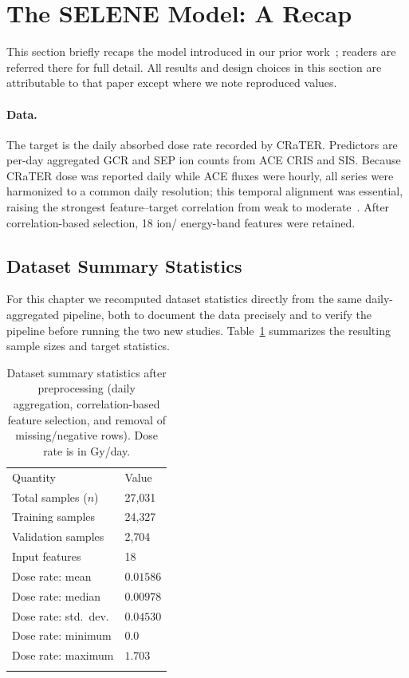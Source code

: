 \documentclass[graybox]{SNmult}
\begin{document}
\section{The SELENE Model: A Recap}
\label{sec:selene}

This section briefly recaps the model introduced in our prior
work~\cite{tummala2025selene}; readers are referred there for full detail. All
results and design choices in this section are attributable to that paper except
where we note reproduced values.

\paragraph{Data.}
The target is the daily absorbed dose rate recorded by CRaTER. Predictors are
per-day aggregated GCR and SEP ion counts from ACE CRIS and SIS. Because CRaTER
dose was reported daily while ACE fluxes were hourly, all series were harmonized
to a common daily resolution; this temporal alignment was essential, raising the
strongest feature--target correlation from weak to
moderate~\cite{tummala2025selene}. After correlation-based selection, 18 ion/
energy-band features were retained.

\subsection{Dataset Summary Statistics}
\label{sec:dataset-stats}
For this chapter we recomputed dataset statistics directly from the same daily-
aggregated pipeline, both to document the data precisely and to verify the
pipeline before running the two new studies. Table~\ref{tab:dataset} summarizes
the resulting sample sizes and target statistics.

\begin{table}[t]
  \caption{Dataset summary statistics after preprocessing (daily aggregation,
  correlation-based feature selection, and removal of missing/negative rows).
  Dose rate is in Gy/day.}
  \label{tab:dataset}
  \begin{tabular}{p{5.5cm}p{2.5cm}}
    \hline\noalign{\smallskip}
    Quantity & Value \\
    \noalign{\smallskip}\svhline\noalign{\smallskip}
    Total samples ($n$) & 27{,}031 \\
    Training samples & 24{,}327 \\
    Validation samples & 2{,}704 \\
    Input features & 18 \\
    Dose rate: mean & $0.01586$ \\
    Dose rate: median & $0.00978$ \\
    Dose rate: std.\ dev. & $0.04530$ \\
    Dose rate: minimum & $0.0$ \\
    Dose rate: maximum & $1.703$ \\
    \noalign{\smallskip}\hline
  \end{tabular}
\end{table}
\end{document}
